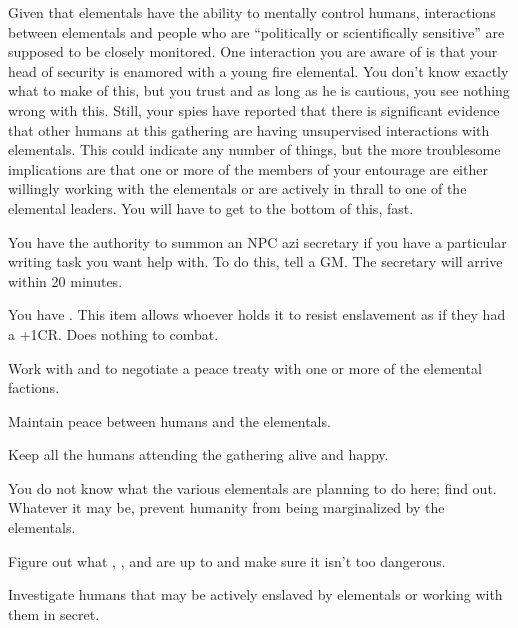 \documentclass[char]{elementals}
\begin{document}
Given that elementals have the ability to mentally control humans, interactions between elementals and people who are ``politically or scientifically sensitive'' are supposed to be closely monitored. One interaction you are aware of is that your head of security \cRomeo{} is enamored with a young fire elemental. You don't know exactly what to make of this, but you trust \cRomeo{} and as long as he is cautious, you see nothing wrong with this. Still, your spies have reported that there is significant evidence that other humans at this gathering are having unsupervised interactions with elementals. This could indicate any number of things, but the more troublesome implications are that one or more of the members of your entourage are either willingly working with the elementals or are actively in thrall to one of the elemental leaders. You will have to get to the bottom of this, fast.



\begin{itemz}[Notes]
	\item  You have the authority to summon an NPC azi secretary if you have a particular writing task you want help with. To do this, tell a GM. The secretary will arrive within 20 minutes.
	\item You have \iEleShield{}. This item allows whoever holds it to resist enslavement as if they had a +1CR. Does nothing to combat.
\end{itemz}

\begin{itemz}[Goals]
  \item Work with \cAvatar{} and \cDiplomat{} to negotiate a peace treaty with one or more of the elemental factions.
  \item Maintain peace between humans and the elementals.
  \item Keep all the humans attending the gathering alive and happy.
  \item You do not know what the various elementals are planning to do here; find out. Whatever it may be, prevent humanity from being marginalized by the elementals.
  \item Figure out what \cGD{}, \cMS{}, and \cScientist{} are up to and make sure it isn't too dangerous.
  \item Investigate humans that may be actively enslaved by elementals or working with them in secret.
\end{itemz}
\end{document}
